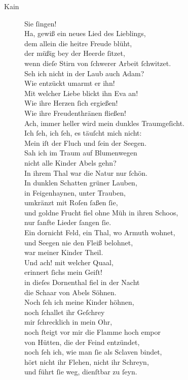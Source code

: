 \documentclass[parskip=full]{scrreprt}
\begin{document}
\begin{description}
  \item[Kain]
  Sie ſingen!\\
  Ha, gewiß ein neues Lied des Lieblings,\\
  dem allein die heitre Freude blüht,\\
  der müßig bey der Heerde ſitzet,\\
  wenn dieſe Stirn von ſchwerer Arbeit ſchwitzet.\\
  Seh ich nicht in der Laub auch Adam?\\
  Wie entzückt umarmt er ihn!\\
  Mit welcher Liebe blickt ihn Eva an!\\
  Wie ihre Herzen ſich ergießen!\\
  Wie ihre Freudenthränen fließen!\\
  Ach, immer heller wird mein dunkles Traumgeſicht.\\
  Ich ſeh, ich ſeh, es täuſcht mich nicht:\\
  Mein iſt der Fluch und ſein der Seegen.\\
  Sah ich im Traum auf Blumenwegen\\
  nicht alle Kinder Abels gehn?\\
  In ihrem Thal war die Natur nur ſchön.\\
  In dunklen Schatten grüner Lauben,\\
  in Feigenhaynen, unter Trauben,\\
  umkränzt mit Roſen ſaßen ſie,\\
  und goldne Frucht fiel ohne Müh in ihren Schoos,\\
  nur ſanfte Lieder ſangen ſie.\\
  Ein dornicht Feld, ein Thal, wo Armuth wohnet,\\
  und Seegen nie den Fleiß belohnet,\\
  war meiner Kinder Theil.\\
  Und ach! mit welcher Quaal,\\
  erinnert ſichs mein Geiſt!\\
  in dieſes Dornenthal fiel in der Nacht\\
  die Schaar von Abels Söhnen.\\
  Noch ſeh ich meine Kinder höhnen,\\
  noch ſchallet ihr Geſchrey\\
  mir ſchrecklich in mein Ohr,\\
  noch ſteigt vor mir die Flamme hoch empor\\
  von Hütten, die der Feind entzündet,\\
  noch ſeh ich, wie man ſie als Sclaven bindet,\\
  hört nicht ihr Flehen, nicht ihr Schreyn,\\
  und führt ſie weg, dienſtbar zu ſeyn.
\end{description}
\end{document}
